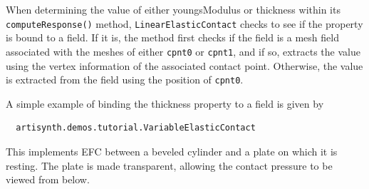 When determining the value of either {\sf youngsModulus} or {\sf
thickness} within its {\tt computeResponse()} method, \pdfbreak
{\tt LinearElasticContact} checks to see if the property is bound to a
field. If it is, the method first checks if the field is a mesh field
associated with the meshes of either {\tt cpnt0} or {\tt cpnt1}, and
if so, extracts the value using the vertex information of the
associated contact point. Otherwise, the value is extracted from the
field using the position of {\tt cpnt0}.

A simple example of binding the {\sf thickness} property to a field is
given by
%
\begin{verbatim}
  artisynth.demos.tutorial.VariableElasticContact
\end{verbatim}
%
This implements EFC between a beveled cylinder and a plate on which
it is resting. The plate is made transparent, allowing the contact
pressure to be viewed from below.

